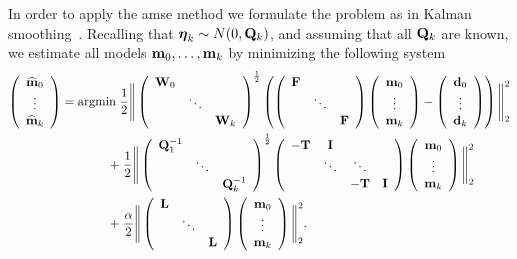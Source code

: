 \documentclass[11pt]{article}
\begin{document}
In order to apply the amse method we formulate the problem as in Kalman smoothing~\cite{kalman1960,Aravkin2013}. Recalling that  ${\boldsymbol \eta}_k \sim N(0,{\bf{Q}}_k)$, and assuming that all ${\bf{Q}}_k$ are known, we estimate all models ${\bf{m}}_0, \hdots, {\bf{m}}_k$ by minimizing the following system 
\begin{align}
\left(\begin{array}{c}  {\widehat{{\bf{m}}}}_0  \\ \vdots \\ {\widehat{{\bf{m}}}}_k\end{array}\right)
={\rm argmin }\;
& \frac12 \Bigg\|
\left(\begin{array}{ccc}{\bf{W}}_0 & &  \\ & \ddots &  \\  &  & {\bf{W}}_k \end{array}\right)^{\frac12}	
\left(
\left(\begin{array}{ccc}{\bf{F}} & &  \\    & \ddots & \\ & & {\bf{F}} \end{array}\right)	
\left(\begin{array}{c}  {\bf{m}}_0  \\ \vdots \\ {\bf{m}}_k\end{array}\right) -
\left(\begin{array}{c} {\bf{d}}_0   \\ \vdots \\ {\bf{d}}_k\end{array}\right)
\right)\Bigg\|^2_2\\
\nonumber
 + 
& \;\frac12 \Bigg\|
\left(\begin{array}{ccc}{\bf{Q}}^{-1}_1 &  \\ & \ddots  \\ & &{\bf{Q}}^{-1}_k \end{array}\right)^{\frac12}
\left( \begin{array}{cccc} -{\bf{T}} & {\bf{I}} &   \\  & \ddots & \ddots\\ & &   -{\bf{T}} & {\bf{I}}  \end{array}\right)
\left(\begin{array}{c}  {\bf{m}}_0  \\ \vdots \\ {\bf{m}}_k \end{array}\right)\Bigg\|^2_2\\
 + & \;{\frac \alpha 2}\Bigg\|
\left(\begin{array}{ccc}{\bf{L}} &  \\ & \ddots  \\ & &{\bf{L}}\end{array}\right)
\left(\begin{array}{c}  {\bf{m}}_0  \\ \vdots \\ {\bf{m}}_k \end{array}\right)\Bigg\|^2_2. 
\end{align}
\end{document}

